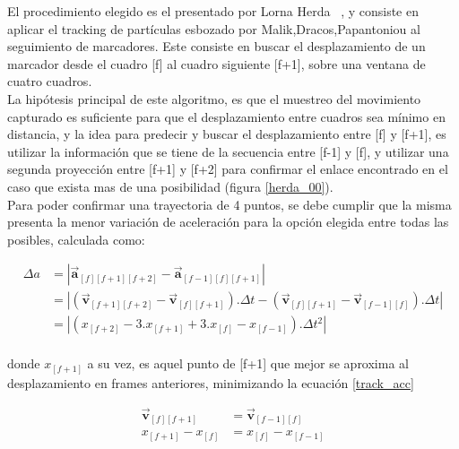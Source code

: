 El procedimiento elegido es el presentado por Lorna Herda~\cite{herda} , y consiste en aplicar el tracking de partículas esbozado por Malik,Dracos,Papantoniou \cite{griegos} al seguimiento de marcadores. Este consiste en buscar el desplazamiento de un marcador desde el cuadro [f] al cuadro siguiente [f+1], sobre una ventana de cuatro cuadros.
\\ 

La hipótesis principal de este algoritmo, es que el muestreo del movimiento capturado es suficiente para que el desplazamiento entre cuadros sea mínimo en distancia, y la idea para predecir y buscar el desplazamiento entre [f] y [f+1], es utilizar la información que se tiene de la secuencia entre [f-1] y [f], y utilizar una segunda proyección entre [f+1] y [f+2] para confirmar el enlace encontrado en el caso que exista mas de una posibilidad (figura \ref{herda_00}).
\\ 

Para poder confirmar una trayectoria de 4 puntos, se debe cumplir que la misma presenta la menor variación de aceleración para la opción elegida entre todas las posibles, calculada como:

\begin{equation}
\begin{split}
\Delta{a}&= \left| \boldsymbol{\overrightarrow{a}}_{[f][f+1][f+2]}-\boldsymbol{\overrightarrow{a}}_{[f-1][f][f+1]} \right| \\
&= \left| \left(\boldsymbol{\overrightarrow{v}}_{[f+1][f+2]}-\boldsymbol{\overrightarrow{v}}_{[f][f+1]}\right).\Delta{t}-\left(\boldsymbol{\overrightarrow{v}}_{[f][f+1]}-\boldsymbol{\overrightarrow{v}}_{[f-1][f]}\right).\Delta{t} \right| \\
&= \left|\left( x_{[f+2]} - 3.x_{[f+1]} + 3.x_{[f]} - x_{[f-1]} \right).\Delta{t}^2\right|\\
\end{split}
\label{track_var_acc}
\end{equation}

donde $x_{[f+1]}$ a su vez, es aquel punto de [f+1] que mejor se aproxima al desplazamiento en frames anteriores, minimizando la ecuación \ref{track_acc} 

\begin{equation}
\begin{split}
\boldsymbol{\overrightarrow{v}}_{[f][f+1]}& = \boldsymbol{\overrightarrow{v}}_{[f-1][f]} \\
x_{[f+1]}-x_{[f]}& = x_{[f]}-x_{[f-1]} \\
\end{split}
\label{track_acc}
\end{equation}

